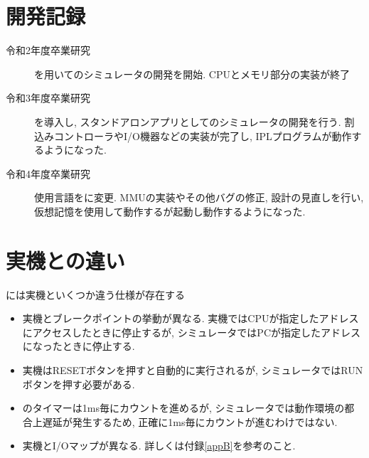 \section{開発記録}

\begin{description}
    \item[令和2年度卒業研究] \js を用いて\tac のシミュレータの開発を開始. CPUとメモリ部分の実装が終了
    \item[令和3年度卒業研究] \electron を導入し, スタンドアロンアプリとして\tac のシミュレータの開発を行う. 割込みコントローラやI/O機器などの実装が完了し, IPLプログラムが動作するようになった.
    \item[令和4年度卒業研究] 使用言語を\ts に変更. MMUの実装やその他バグの修正, 設計の見直しを行い, 仮想記憶を使用して動作する\tacos が起動し動作するようになった.
\end{description}

\section{実機との違い}

\tacsim には\tac 実機といくつか違う仕様が存在する

\begin{itemize}
    \item \tac 実機とブレークポイントの挙動が異なる. 実機ではCPUが指定したアドレスにアクセスしたときに停止するが, シミュレータではPCが指定したアドレスになったときに停止する.
    \item 実機はRESETボタンを押すと自動的に実行されるが, シミュレータではRUNボタンを押す必要がある.
    \item \tac のタイマーは1ms毎にカウントを進めるが, シミュレータでは動作環境の都合上遅延が発生するため, 正確に1ms毎にカウントが進むわけではない.
    \item 実機とI/Oマップが異なる. 詳しくは付録\ref{appB}を参考のこと.
\end{itemize}